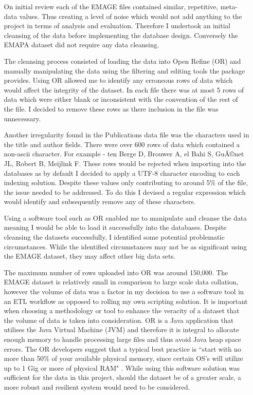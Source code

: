 On initial review each of the EMAGE files contained similar, repetitive, meta-data values. Thus creating a level of noise which would not add anything to the project in terms of analysis and evaluation. Therefore I undertook an initial cleansing of the data before implementing the database design. Conversely the EMAPA dataset did not require any data cleansing.

The cleansing process consisted of loading the data into Open Refine (OR) and manually manipulating the data using the filtering and editing tools the package provides. Using OR allowed me to identify any erroneous rows of data which would affect the integrity of the dataset. In each file there was at most 5 rows of data which were either blank or inconsistent with the convention of the rest of the file. I decided to remove these rows as there inclusion in the file was unnecessary.

Another irregularity found in the Publications data file was the characters used in the title and author fields. There were over 600 rows of data which contained a non-ascii character. For example - ten Berge D, Brouwer A, el Bahi S, GuÃ©net JL, Robert B, Meijlink F. These rows would be rejected when importing into the databases as by default I decided to apply a UTF-8 character encoding to each indexing solution. Despite these values only contributing to around 5\% of the file, the issue needed to be addressed. To do this I devised a regular expression which would identify and subsequently remove any of these characters.

Using a software tool such as OR enabled me to manipulate and cleanse the data meaning I would be able to load it successfully into the databases. Despite cleansing the datasets successfully, I identified some potential problematic circumstances. While the identified circumstances may not be as significant using the EMAGE dataset, they may affect other big data sets.

The maximum number of rows uploaded into OR was around 150,000. The EMAGE dataset is relatively small in comparison to large scale data collation, however the volume of data was a factor in my decision to use a software tool in an ETL workflow as opposed to rolling my own scripting solution. It is important when choosing a methodology or tool to enhance the veracity of a dataset that the volume of data is taken into consideration. OR is a Java application that utilises the Java Virtual Machine (JVM) and therefore it is integral to allocate enough memory to handle processing large files and thus avoid Java heap space errors. The OR developers suggest that a typical best practice is ``start with no more than 50\% of your available physical memory, since certain OS's will utilize up to 1 Gig or more of physical RAM" \cite{googref}. While using this software solution was sufficient for the data in this project, should the dataset be of a greater scale, a more robust and resilient system would need to be considered.

